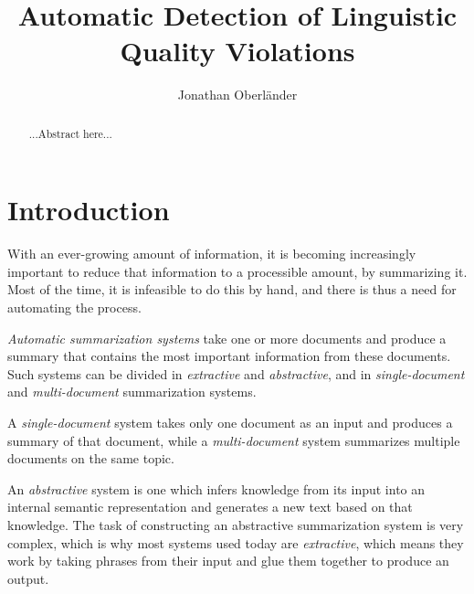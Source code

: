 \documentclass[a4paper,10pt]{scrartcl}
\author{Jonathan Oberländer}
\title{Automatic Detection of Linguistic Quality Violations}
\theoremstyle{style}
\begin{document}


\thispagestyle{empty}
\begin{abstract}
\setlength{\parskip}{2ex plus 0.5ex minus 0.2ex}
...Abstract here...

\end{abstract}
\newpage

\thispagestyle{empty}
\tableofcontents
\newpage

\setcounter{page}{1}		%
\newpage







\maketableofcontents

\section{Introduction}
With an ever-growing amount of information, it is becoming increasingly important to reduce that information to a processible amount, by summarizing it. Most of the time, it is infeasible to do this by hand, and there is thus a need for automating the process.

\textit{Automatic summarization systems} take one or more documents and produce a summary that contains the most important information from these documents. Such systems can be divided in \textit{extractive} and \textit{abstractive}, and in \textit{single-document} and \textit{multi-document} summarization systems.

A \textit{single-document} system takes only one document as an input and produces a summary of that document, while a \textit{multi-document} system summarizes multiple documents on the same topic.

An \textit{abstractive} system is one which infers knowledge from its input into an internal semantic representation and generates a new text based on that knowledge. The task of constructing an abstractive summarization system is very complex, which is why most systems used today are \textit{extractive}, which means they work by taking phrases from their input and glue them together to produce an output.
\end{document}
